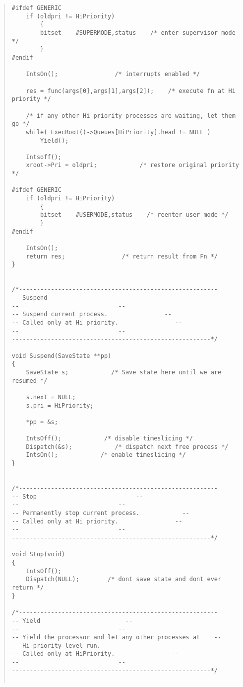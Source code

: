 \begin {quote}
\begin{verbatim}
#ifdef GENERIC
    if (oldpri != HiPriority)
        {
        bitset    #SUPERMODE,status    /* enter supervisor mode */
        }
#endif

    IntsOn();                /* interrupts enabled */

    res = func(args[0],args[1],args[2]);    /* execute fn at Hi priority */

    /* if any other Hi priority processes are waiting, let them go */
    while( ExecRoot()->Queues[HiPriority].head != NULL )
        Yield();

    Intsoff();
    xroot->Pri = oldpri;            /* restore original priority */

#ifdef GENERIC
    if (oldpri != HiPriority)
        {
        bitset    #USERMODE,status    /* reenter user mode */
        }
#endif

    IntsOn();
    return res;                /* return result from Fn */
}


/*--------------------------------------------------------
-- Suspend                        --
--                            --
-- Suspend current process.                --
-- Called only at Hi priority.                --
--                            --
--------------------------------------------------------*/

void Suspend(SaveState **pp)
{
    SaveState s;            /* Save state here until we are resumed */

    s.next = NULL;
    s.pri = HiPriority;

    *pp = &s;

    IntsOff();            /* disable timeslicing */
    Dispatch(&s);            /* dispatch next free process */
    IntsOn();            /* enable timeslicing */
}


/*--------------------------------------------------------
-- Stop                            --
--                            --
-- Permanently stop current process.            --
-- Called only at Hi priority.                --
--                            --
--------------------------------------------------------*/

void Stop(void)
{
    IntsOff();
    Dispatch(NULL);        /* dont save state and dont ever return */
}

/*--------------------------------------------------------
-- Yield                        --
--                            --
-- Yield the processor and let any other processes at    --
-- Hi priority level run.                --
-- Called only at HiPriority.                --
--                            --
--------------------------------------------------------*/


\end{verbatim}
\end{quote}
